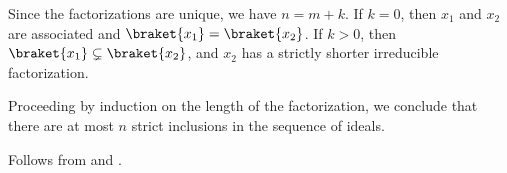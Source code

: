\begin{defproof}
  Since the factorizations are unique, we have \( n = m + k \). If \( k = 0 \), then \( x_1 \) and \( x_2 \) are associated and \( \braket{ x_1 } = \braket{ x_2 } \). If \( k > 0 \), then \( \braket{ x_1 } \subsetneq \braket{ x_2 } \), and \( x_2 \) has a strictly shorter irreducible factorization.

  Proceeding by induction on the length of the factorization, we conclude that there are at most \( n \) strict inclusions in the sequence of ideals.

   Follows from  and .
\end{defproof}

